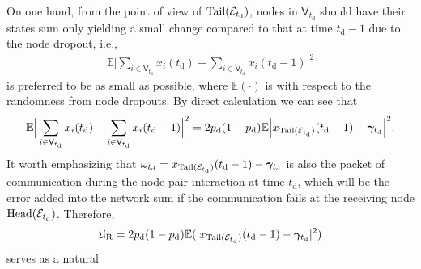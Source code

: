 \documentclass[a4paper, 11pt]{article}
\newcommand{\1}{\mathbf{1}}
\newcommand{\asf}{\mathcal{E}}
\newcommand{\Head}{\textnormal{Head}}
\newcommand{\Tail}{\textnormal{Tail}}
\newcommand{\tdropout}{t_{\mathrm d}}
\newcommand{\pdropout}{p_{\mathrm d}}
\newcommand{\mV}{\mathrm{V}}
\newcommand{\mVrand}{\mathsf{V}}
\newcommand{\gammab}{{\bm \gamma}}
\begin{document}
On one hand, from the point of view of $\Tail(\asf_{\tdropout})$,     nodes in $\mVrand_{\tdropout}$ should have their states sum only yielding   a small change  compared to that at time $\tdropout-1$ due to the node dropout, i.e.,
\begin{equation}\label{eq:expetation_drop_out}
\begin{aligned}
\mathbb{E}\Big|\sum\limits_{i\in\mVrand_{\tdropout}}x_i(\tdropout)-\sum\limits_{i\in\mVrand_{\tdropout}}x_i(\tdropout-1)\Big|^2
\end{aligned}
\end{equation}
is preferred to be as small as possible, where $\mathbb{E}(\cdot)$ is with respect to the randomness from node dropouts. By direct calculation we can see that
\begin{equation}\label{eq:zeta_omega}
\begin{aligned}
\mathbb{E}\Big|\sum\limits_{i\in\mVrand_{\tdropout}}x_i(\tdropout)-\sum\limits_{i\in\mVrand_{\tdropout}}x_i(\tdropout-1)\Big|^2= 2\pdropout(1-\pdropout)\mathbb{E} \Big|x_{\Tail(\asf_{\tdropout})}(\tdropout-1)-\gammab_{\tdropout}\Big|^2.
\end{aligned}
\end{equation}
It worth emphasizing that $\omega_{\tdropout}=x_{\Tail(\asf_{\tdropout})}(\tdropout-1)-\gammab_{\tdropout}$ is also the packet of communication during the node pair interaction at time $\tdropout$, which will be the error added into the network sum if the communication fails at the receiving node $\Head(\asf_{\tdropout})$. Therefore,  $$
\mathfrak{U}_{\rm R}=2\pdropout(1-\pdropout)\mathbb{E}(|x_{\Tail(\asf_{\tdropout})}(\tdropout-1)-\gammab_{\tdropout}|^2)
$$ serves as a natural
\end{document}
